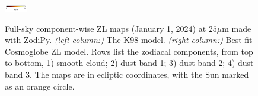 \documentclass[twocolumn]{aa}
\begin{document}
\begin{figure}
{    \includegraphics[width=1cm,angle=90]{figs/comp_maps/cbar_3_inst.pdf}%
    }\\
    \caption{Full-sky component-wise ZL maps (January 1, 2024) at $25\mu$m made with ZodiPy. 
    \textit{(left column:)} The K98 model. \textit{(right column:)} Best-fit Cosmoglobe ZL model. 
    Rows list the zodiacal components, from top to bottom, 1) smooth cloud; 2) dust band 1; 3) 
    dust band 2; 4) dust band 3. The maps are in ecliptic coordinates, with the Sun marked as 
    an orange circle.}
    \label{fig:mission-averaged-inst-maps}
\end{figure}

\begin{figure}[hbt]
    \centering
    \\
    \\
\end{figure}
\end{document}
